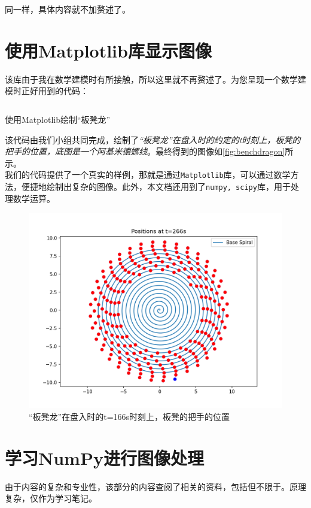同一样，具体内容就不加赘述了。

\section{使用Matplotlib库显示图像}

该库由于我在数学建模时有所接触，所以这里就不再赘述了。为您呈现一个数学建模时正好用到的代码：

\begin{longlisting}
    \inputminted{python}{./Codes/Matplotlib/1.py}
    \caption{使用Matplotlib绘制“板凳龙”}
    \label{listing:benchdragon}
\end{longlisting}

该代码由我们小组共同完成，绘制了\textit{“板凳龙”在盘入时的约定的t时刻上，板凳的把手的位置，底图是一个阿基米德螺线}。最终得到的图像如\autoref{fig:benchdragon}所示。\\

我们的代码提供了一个真实的样例，那就是通过\texttt{Matplotlib}库，可以通过数学方法，便捷地绘制出复杂的图像。此外，本文档还用到了\texttt{numpy, scipy}库，用于处理数学运算。\\

\begin{figure}[!h]
    \centering
    \includegraphics[width=.8\textwidth]{./Figures/M.png}
    \caption{“板凳龙”在盘入时的t=166s时刻上，板凳的把手的位置}
    \label{fig:benchdragon}
\end{figure}

\section{学习NumPy进行图像处理}

由于内容的复杂和专业性，该部分的内容查阅了相关的资料，包括但不限于\cite{solem2014python计算机视觉编程}。原理复杂，仅作为学习笔记。


